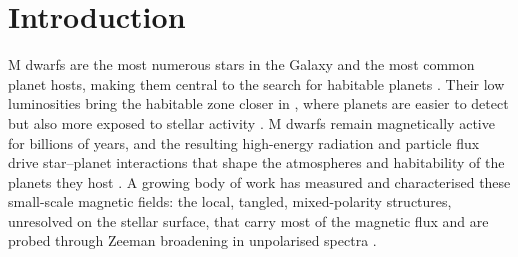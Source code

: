 

\section{Introduction}
\label{chap:intro}

M dwarfs are the most numerous stars in the Galaxy and the most common planet hosts, making them central to the search for habitable planets \citep{Bonfils_2013, Dressing_2015, Gaidos_2016, Henry_2018}. Their low luminosities bring the habitable zone closer in \citep{Kopparapu_2013}, where planets are easier to detect \citep{Charbonneau_2007} but also more exposed to stellar activity \citep{Shields_2016}. M dwarfs remain magnetically active for billions of years, and the resulting high-energy radiation and particle flux drive star--planet interactions \citep{Vidotto_2018} that shape the atmospheres and habitability of the planets they host \citep{Hebrard_2016, Dumusque_2021, Bellotti_2022}. A growing body of work has measured and characterised these small-scale magnetic fields: the local, tangled, mixed-polarity structures, unresolved on the stellar surface, that carry most of the magnetic flux and are probed through Zeeman broadening in unpolarised spectra \citep{Saar_1985, Johns_1996, shulyak+2014, Kochukhov_2021, reiners+2022, cristofari_2023a, cristofari_2023b, Donati_2025}.


